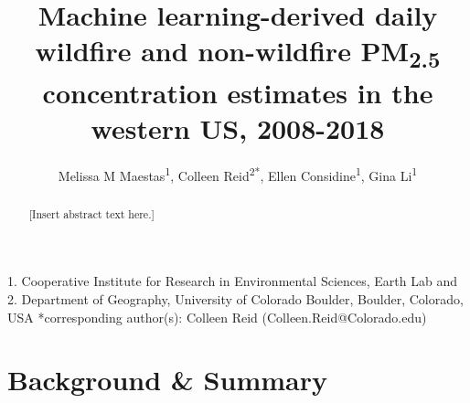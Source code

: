 \documentclass[english]{article}
\begin{document}

\title{Machine learning-derived daily wildfire and non-wildfire PM\textsubscript{2.5} concentration estimates in the western US, 2008-2018}

\author{Melissa M Maestas\textsuperscript{1}, 
Colleen Reid\textsuperscript{2{*}},
Ellen Considine\textsuperscript{1},
Gina Li\textsuperscript{1}}

\maketitle
\thispagestyle{fancy}

1. Cooperative Institute for Research in
Environmental Sciences, Earth Lab and %
2. Department of Geography, University of Colorado Boulder,
Boulder, Colorado, USA 
{*}corresponding author(s): Colleen Reid (Colleen.Reid@Colorado.edu)

\begin{abstract}

[Insert abstract text here.]

\end{abstract}

\section*{Background \& Summary}
\end{document}
